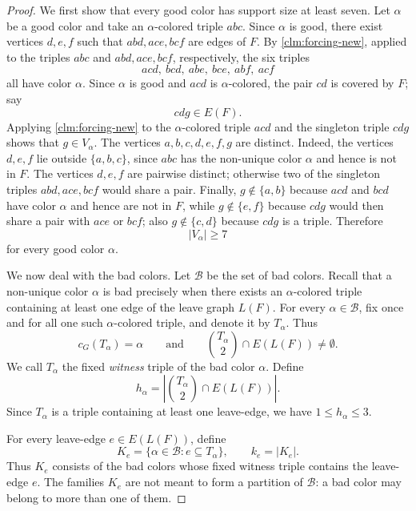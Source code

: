 \documentclass[10pt,a4paper]{article}
\theoremstyle{definition}
\newcommand{\cB}{\mathcal{B}}
\begin{document}
\begin{proof}
    We first show that every good color has support size at least seven.
    Let $\alpha$ be a good color and take an $\alpha$-colored triple $abc$.
    Since $\alpha$ is good, there exist vertices $d,e,f$ such that $abd,ace,bcf$ are edges of $F$.
    By \cref{clm:forcing-new}, applied to the triples
    $abc$ and $abd,ace,bcf$, respectively, the six triples
    \[
        acd,\ bcd,\ abe,\ bce,\ abf,\ acf
    \]
    all have color $\alpha$.
    Since $\alpha$ is good and $acd$ is $\alpha$-colored, the pair $cd$ is
    covered by $F$; say
    \[
        cdg\in E(F).
    \]
    Applying \cref{clm:forcing-new} to the $\alpha$-colored triple $acd$ and
    the singleton triple $cdg$ shows that $g\in V_\alpha$.
    The vertices $a,b,c,d,e,f,g$ are distinct.  Indeed, the vertices
    $d,e,f$ lie outside $\{a,b,c\}$, since $abc$ has the non-unique color
    $\alpha$ and hence is not in $F$.  The vertices $d,e,f$ are pairwise
    distinct; otherwise two of the singleton triples $abd,ace,bcf$ would
    share a pair.  Finally, $g\notin\{a,b\}$ because $acd$ and $bcd$ have
    color $\alpha$ and hence are not in $F$, while $g\notin\{e,f\}$ because
    $cdg$ would then share a pair with $ace$ or $bcf$; also
    $g\notin\{c,d\}$ because $cdg$ is a triple.  Therefore
    \begin{equation}\label{eq:good-support-new}
        |V_\alpha|\ge 7
    \end{equation}
    for every good color $\alpha$.

    We now deal with the bad colors.  Let $\cB$ be the set of bad colors.
    Recall that a non-unique color $\alpha$ is bad precisely when there exists
    an $\alpha$-colored triple containing at least one edge of the leave graph
    $L(F)$.  For every $\alpha\in\cB$, fix once and for all one such
    $\alpha$-colored triple, and denote it by $T_\alpha$.
    Thus
    \[
        c_G(T_\alpha)=\alpha
        \qquad\text{and}\qquad
        \binom{T_\alpha}{2}\cap E(L(F))\ne\emptyset.
    \]
    We call $T_\alpha$ the fixed {\it witness} triple of the bad color $\alpha$.
    Define
    \[
        h_\alpha=
        \left|\binom{T_\alpha}{2}\cap E(L(F))\right|.
    \]
    Since $T_\alpha$ is a triple containing at least one leave-edge, we have $1\le h_\alpha\le3$.

    For every leave-edge $e\in E(L(F))$, define
    \[
        K_e=\{\alpha\in\cB: e\subseteq T_\alpha\},
        \qquad
        k_e=|K_e|.
    \]
    Thus $K_e$ consists of the bad colors whose fixed witness triple contains
    the leave-edge $e$.  The families $K_e$ are not meant to form a partition
    of $\cB$: a bad color may belong to more than one of them.



\end{proof}
\end{document}
